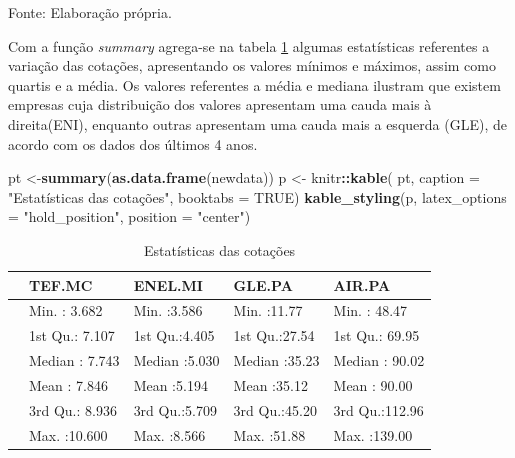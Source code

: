 \documentclass[
  12pt,
  a4paper,
  openany]{book}
\newenvironment{Shaded}{\begin{snugshade}}{\end{snugshade}}
\newcommand{\DataTypeTok}[1]{\textcolor[rgb]{0.13,0.29,0.53}{#1}}
\newcommand{\KeywordTok}[1]{\textcolor[rgb]{0.13,0.29,0.53}{\textbf{#1}}}
\newcommand{\NormalTok}[1]{#1}
\newcommand{\OperatorTok}[1]{\textcolor[rgb]{0.81,0.36,0.00}{\textbf{#1}}}
\newcommand{\OtherTok}[1]{\textcolor[rgb]{0.56,0.35,0.01}{#1}}
\newcommand{\StringTok}[1]{\textcolor[rgb]{0.31,0.60,0.02}{#1}}
\begin{document}
Fonte: Elaboração própria.

\justifying
\bigskip

Com a função \emph{summary} agrega-se na tabela \ref{tab:estcot} algumas estatísticas referentes a variação das cotações, apresentando os valores mínimos e máximos, assim como quartis e a média. Os valores referentes a média e mediana ilustram que existem empresas cuja distribuição dos valores apresentam uma cauda mais à direita(ENI), enquanto outras apresentam uma cauda mais a esquerda (GLE), de acordo com os dados dos últimos 4 anos.

\scriptsize

\begin{Shaded}
\begin{Highlighting}[]
\NormalTok{pt \textless{}{-}}\KeywordTok{summary}\NormalTok{(}\KeywordTok{as.data.frame}\NormalTok{(newdata))}
\NormalTok{p \textless{}{-}}\StringTok{ }\NormalTok{knitr}\OperatorTok{::}\KeywordTok{kable}\NormalTok{(}
\NormalTok{  pt, }\DataTypeTok{caption =} \StringTok{"Estatísticas das cotações"}\NormalTok{,}
  \DataTypeTok{booktabs =} \OtherTok{TRUE}\NormalTok{)}
\KeywordTok{kable\_styling}\NormalTok{(p, }\DataTypeTok{latex\_options =} \StringTok{"hold\_position"}\NormalTok{, }\DataTypeTok{position =} \StringTok{"center"}\NormalTok{)}
\end{Highlighting}
\end{Shaded}

\begin{table}[!h]

\caption{\label{tab:estcot}Estatísticas das cotações}
\centering
\begin{tabular}[t]{lllll}
\toprule
  &     TEF.MC &    ENEL.MI &     GLE.PA &     AIR.PA\\
\midrule
 & Min.   : 3.682 & Min.   :3.586 & Min.   :11.77 & Min.   : 48.47\\
 & 1st Qu.: 7.107 & 1st Qu.:4.405 & 1st Qu.:27.54 & 1st Qu.: 69.95\\
 & Median : 7.743 & Median :5.030 & Median :35.23 & Median : 90.02\\
 & Mean   : 7.846 & Mean   :5.194 & Mean   :35.12 & Mean   : 90.00\\
 & 3rd Qu.: 8.936 & 3rd Qu.:5.709 & 3rd Qu.:45.20 & 3rd Qu.:112.96\\
\addlinespace
 & Max.   :10.600 & Max.   :8.566 & Max.   :51.88 & Max.   :139.00\\
\bottomrule
\end{tabular}
\end{table}
\normalsize
\FloatBarrier
\centering
\end{document}
